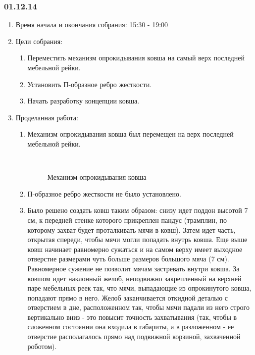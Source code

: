 \subsubsection{01.12.14}

\begin{enumerate}
	\item Время начала и окончания собрания:
	15:30 - 19:00
	\item Цели собрания:
	\begin{enumerate}
	  \item Переместить механизм опрокидывания ковша на самый верх последней мебельной рейки.
	  
	  \item Установить П-образное ребро жесткости.
	  
	  \item Начать разработку концепции ковша.
	  
    \end{enumerate}
	\item Проделанная работа:
	\begin{enumerate}
	  \item Механизм опрокидывания ковша был перемещен на верх последней мебельной рейки.
	  
	  \begin{figure}[H]
	  	\begin{minipage}[h]{0.2\linewidth}
	  		\center  
	  	\end{minipage}
	  	\begin{minipage}[h]{0.6\linewidth}
	  		\caption{Механизм опрокидывания ковша}
	  	\end{minipage}
	  \end{figure}
	  
	  \item П-образное ребро жесткости не было установлено.
	  
	  \item Было решено создать ковш таким образом: снизу идет поддон высотой 7 см, к передней стенке которого прикреплен пандус (трамплин, по которому захват будет проталкивать мячи в ковш). Затем идет часть, открытая спереди, чтобы мячи могли попадать внутрь ковша. Еще выше ковш начинает равномерно сужаться и на самом верху имеет выходное отверстие размерами чуть больше размеров большого мяча (7 см). Равномерное сужение не позволит мячам застревать внутри ковша. За ковшом идет наклонный желоб, неподвижно закрепленный на верхней паре мебельных реек так, что мячи, выпадающие из опрокинутого ковша, попадают прямо в него. Желоб заканчивается откидной деталью с отверстием в дне, расположенном так, чтобы мячи падали из него строго вертикально вниз - это повысит точность захватывания (так, чтобы в сложенном состоянии она входила в габариты, а в разложенном - ее отверстие располагалось прямо над подвижной корзиной, захваченной роботом).
	  

\end{enumerate}
\end{enumerate}
